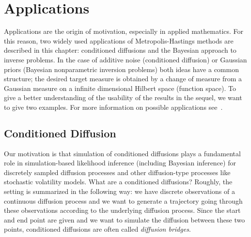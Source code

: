 \chapter{Applications}
\label{Application}


Applications are the origin of motivation, especially in applied mathematics. For this reason, two widely used applications of Metropolis-Hastings methods are described in this chapter: conditioned diffusions and the Bayesian approach to inverse problems. In the case of additive noise (conditioned diffusion) or Gaussian priors (Bayesian nonparametric inversion problems) both ideas have a common structure; the desired target measure is obtained by a change of measure from a Gaussian measure on a infinite dimensional Hilbert space (function space). To give a better understanding of the usability of the results in the sequel, we want to give two examples. For more information on possible applications see~\autocite{Beskos2009, Beskos2008, Dashti2012, Dashti2013, Delyon2006, Hairer2011, Stuart2010}.

\section{Conditioned Diffusion}

Our motivation is that simulation of conditioned diffusions plays a fundamental role in simulation-based likelihood inference (including Bayesian inference) for discretely sampled diffusion processes and other diffusion-type processes like stochastic volatility models. What are a conditioned diffusions?  Roughly, the setting is summarized in the following way: we have discrete observations of a continuous diffusion process and we want to generate a trajectory going through these observations according to the underlying diffusion process. Since the start and end point are given and we want to simulate the diffusion between these two points, conditioned diffusions are often called \textit{diffusion bridges}.

